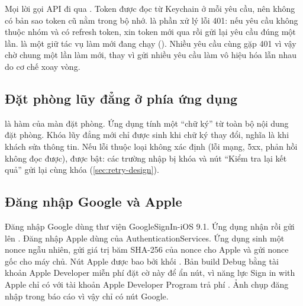 Mọi lời gọi API đi qua . Token được đọc từ Keychain ở mỗi yêu cầu, nên không có bản sao token cũ nằm trong bộ nhớ.  là phần xử lý lỗi 401: nếu yêu cầu không thuộc nhóm  và có refresh token,  xin token mới qua  rồi gửi lại yêu cầu đúng một lần.  là một  giữ tác vụ làm mới đang chạy (). Nhiều yêu cầu cùng gặp 401 vì vậy chờ chung một lần làm mới, thay vì gửi nhiều yêu cầu  làm vô hiệu hóa lẫn nhau do cơ chế xoay vòng.





\subsection{Đặt phòng lũy đẳng ở phía ứng dụng}

 là hàm  của màn đặt phòng. Ứng dụng tính một ``chữ ký'' từ toàn bộ nội dung đặt phòng. Khóa lũy đẳng mới chỉ được sinh khi chữ ký thay đổi, nghĩa là khi khách sửa thông tin. Nếu lỗi thuộc loại không xác định (lỗi mạng, 5xx, phản hồi không đọc được),  được bật: các trường nhập bị khóa và nút ``Kiểm tra lại kết quả'' gửi lại cùng khóa (\cref{sec:retry-design}).



\subsection{Đăng nhập Google và Apple}

Đăng nhập Google dùng thư viện GoogleSignIn-iOS 9.1. Ứng dụng nhận  rồi gửi lên . Đăng nhập Apple dùng  của AuthenticationServices. Ứng dụng sinh một nonce ngẫu nhiên, gửi giá trị băm SHA-256 của nonce cho Apple và gửi nonce gốc cho máy chủ. Nút Apple được bao bởi khối . Bản build Debug bằng tài khoản Apple Developer miễn phí đặt cờ này để ẩn nút, vì năng lực Sign in with Apple chỉ có với tài khoản Apple Developer Program trả phí \cite{appleprogram}. Ảnh chụp đăng nhập trong báo cáo vì vậy chỉ có nút Google.

